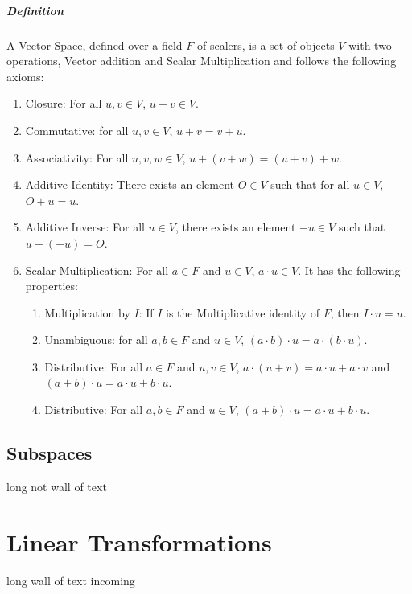 \documentclass[12pt, oneside]{book}
\begin{document}
\paragraph{Definition} A Vector Space, defined over a field \( F \) of scalers, is a set of objects \(V\) with two operations, Vector addition and Scalar Multiplication and follows the following axioms:
\begin{enumerate}
    \item Closure: For all \( u,v \in V \), \(u + v \in V \).
    \item Commutative: for all \( u,v \in V \), \(u + v = v + u \).
    \item Associativity: For all \( u,v,w \in V \), \(u + (v + w) = (u + v) + w \).
    \item Additive Identity: There exists an element \( O \in V \) such that for all \( u \in V \), \(O + u = u \).
    \item Additive Inverse: For all \( u \in V \), there exists an element \( -u \in V \) such that \(u + (-u) = O \).
    \item Scalar Multiplication: For all \( a \in F \) and \( u \in V \), \(a \cdot u \in V \). It has the following properties:
    \begin{enumerate}
        \item Multiplication by \(I\): If \(I\) is the Multiplicative identity of \( F \), then \(I \cdot u = u \).
        \item Unambiguous: for all \( a,b \in F \) and \( u \in V \), \( (a \cdot b) \cdot u = a \cdot (b \cdot u) \).
        \item Distributive: For all \( a \in F \) and \( u,v \in V \), \( a \cdot (u + v) = a \cdot u + a \cdot v \) and \( (a + b) \cdot u = a \cdot u + b \cdot u \).
        \item Distributive: For all \( a,b \in F \) and \( u \in V \), \( (a + b) \cdot u = a \cdot u + b \cdot u \).
    \end{enumerate}
\end{enumerate}
\section{Subspaces}
long not wall of text
\chapter{Linear Transformations}
long wall of text incoming
\end{document}
